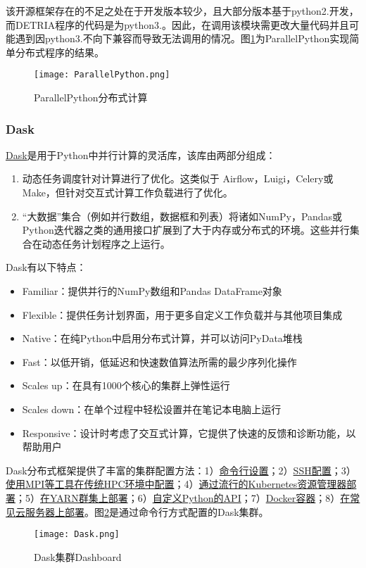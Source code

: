 该开源框架存在的不足之处在于开发版本较少，且大部分版本基于python2.开发，而DETRIA程序的代码是为python3.。因此，在调用该模块需更改大量代码并且可能遇到因python3.不向下兼容而导致无法调用的情况。图\ref{ParallelPython分布式计算}为ParallelPython实现简单分布式程序的结果。

\begin{figure}[h]
    \centering
    \texttt{[image: ParallelPython.png]}
    \caption{ParallelPython分布式计算}
    \label{ParallelPython分布式计算}
\end{figure}

\subsubsection{Dask}
\href{https://dask.org/}{Dask}是用于Python中并行计算的灵活库，该库由两部分组成：
\begin{enumerate}
    \item 动态任务调度针对计算进行了优化。这类似于 Airflow，Luigi，Celery或Make，但针对交互式计算工作负载进行了优化。
    \item “大数据”集合（例如并行数组，数据框和列表）将诸如NumPy，Pandas或Python迭代器之类的通用接口扩展到了大于内存或分布式的环境。这些并行集合在动态任务计划程序之上运行。
\end{enumerate}
Dask有以下特点：
\begin{itemize}
    \item Familiar：提供并行的NumPy数组和Pandas DataFrame对象
    \item Flexible：提供任务计划界面，用于更多自定义工作负载并与其他项目集成
    \item Native：在纯Python中启用分布式计算，并可以访问PyData堆栈
    \item Fast：以低开销，低延迟和快速数值算法所需的最少序列化操作
    \item Scales up：在具有1000个核心的集群上弹性运行
    \item Scales down：在单个过程中轻松设置并在笔记本电脑上运行
    \item Responsive：设计时考虑了交互式计算，它提供了快速的反馈和诊断功能，以帮助用户
\end{itemize}

Dask分布式框架提供了丰富的集群配置方法：1）\href{https://docs.dask.org/en/latest/setup/cli.html}{命令行设置}；2）\href{https://docs.dask.org/en/latest/setup/ssh.html}{SSH配置}；3）\href{https://docs.dask.org/en/latest/setup/hpc.html}{使用MPI等工具在传统HPC环境中配置}；4）\href{https://docs.dask.org/en/latest/setup/kubernetes.html}{通过流行的Kubernetes资源管理器部署}；5）\href{https://yarn.dask.org/en/latest/}{在YARN群集上部署}；6）\href{https://docs.dask.org/en/latest/setup/python-advanced.html}{自定义Python的API}；7）\href{https://docs.dask.org/en/latest/setup/docker.html}{Docker容器}；8）\href{https://docs.dask.org/en/latest/setup/cloud.html}{在常见云服务器上部署}。图\ref{Dask集群Dashboard}是通过命令行方式配置的Dask集群。
\begin{figure}[h]
    \centering
    \texttt{[image: Dask.png]}
    \caption{Dask集群Dashboard}
    \label{Dask集群Dashboard}
\end{figure}

